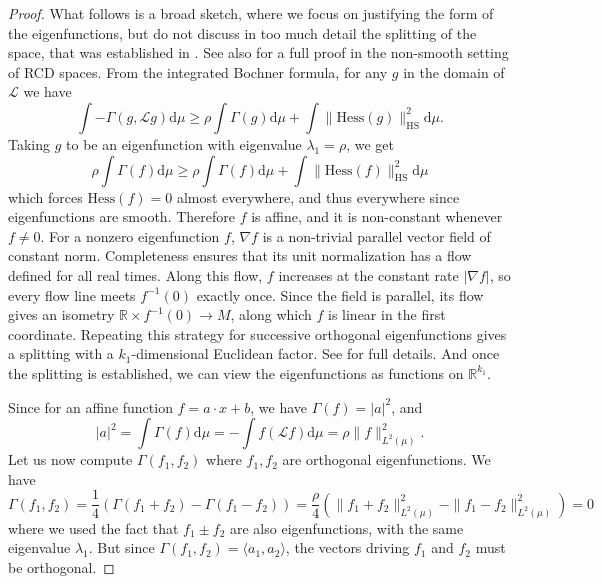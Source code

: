 \documentclass[10pt,reqno]{amsart}
\numberwithin{equation}{section}
\begin{document}
\begin{proof}
  What follows is a broad sketch, where we focus on justifying the form of the
  eigenfunctions, but do not discuss in too much detail the splitting of the
  space, that was established in \cite{CZ17}. See also \cite{GKKO20} for a
  full proof in the non-smooth setting of RCD spaces. From the integrated
  Bochner formula, for any $g$ in the domain of $\mathcal{L}$ we have
  \begin{equation}
    \int-\Gamma(g,\mathcal{L} g)\mathrm{d}\mu 
    \geq \rho \int\Gamma(g)\mathrm{d}\mu + \int\|\mathrm{Hess}(g)\|_{\mathrm{HS}}^2\mathrm{d}\mu.
  \end{equation}
  Taking $g$ to be an eigenfunction with eigenvalue $\lambda_1 = \rho$, we get
  \begin{equation}
    \rho \int\Gamma(f)\mathrm{d}\mu
    \geq \rho \int\Gamma(f)\mathrm{d}\mu + \int\|\mathrm{Hess}(f)\|_{\mathrm{HS}}^2\mathrm{d}\mu
  \end{equation}
  which forces $\mathrm{Hess}(f) = 0$ almost everywhere, and thus everywhere
  since eigenfunctions are smooth. Therefore $f$ is affine, and it is
  non-constant whenever $f\ne0$.
  For a nonzero eigenfunction $f$, $\nabla f$ is a non-trivial parallel
  vector field of constant norm. Completeness ensures that its unit
  normalization has a flow defined for all real times. Along this flow,
  $f$ increases at the constant rate $|\nabla f|$, so every flow line meets
  $f^{-1}(0)$ exactly once. Since the field is parallel, its flow gives an
  isometry $\mathbb{R}\times f^{-1}(0)\to M$, along which $f$ is linear
  in the first coordinate. Repeating this
  strategy for successive orthogonal eigenfunctions gives a splitting with a
  $k_1$-dimensional Euclidean factor. See \cite{CZ17} for full details. And once
  the splitting is established, we can view the eigenfunctions as functions on
  $\mathbb{R}^{k_1}$.

  Since for an affine function $f = a\cdot x + b$, we have $\Gamma(f) = |a|^2$, and
  \begin{equation}
    |a|^2 =\int\Gamma(f)\mathrm{d}\mu = -\int f(\mathcal{L} f)\mathrm{d}\mu = \rho\|f\|_{L^2(\mu)}^2.
  \end{equation}
  Let us now compute $\Gamma(f_1, f_2)$ where $f_1, f_2$ are orthogonal
  eigenfunctions. We have
  \begin{equation}
    \Gamma(f_1, f_2) = \frac{1}{4}(\Gamma(f_1 + f_2) - \Gamma(f_1-f_2)) 
                     = \frac{\rho}{4}(\|f_1 + f_2\|_{L^2(\mu)}^2 - \|f_1 - f_2\|_{L^2(\mu)}^2) 
                     = 0
  \end{equation}
  where we used the fact that $f_1 \pm f_2$ are also eigenfunctions, with the
  same eigenvalue $\lambda_1$. But since
  $\Gamma(f_1, f_2) = \langle a_1, a_2\rangle$, the vectors driving $f_1$ and
  $f_2$ must be orthogonal.
\end{proof}
\end{document}
